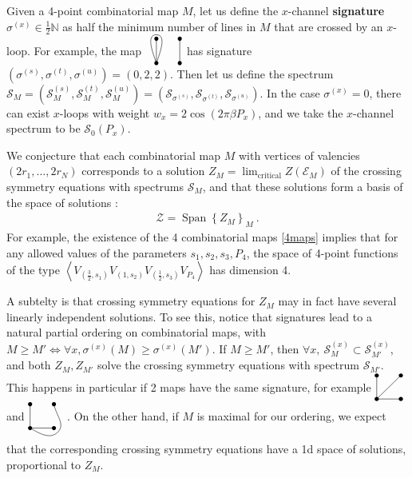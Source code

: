 \documentclass[12pt, a4paper]{article}
\newcommand{\myindex}[1]{\textbf{\boldmath #1}}
\newcommand{\vertices}{
\coordinate (base) at (0, 1);
\draw (0, 0) node[fill, circle, minimum size = 1.3mm, inner sep = 0]{};
  \draw (3, 0) node[fill, circle, minimum size = 1.3mm, inner sep = 0]{};
  \draw (0, 3) node[fill, circle, minimum size = 1.3mm, inner sep = 0]{};
  \draw (3, 3) node[fill, circle, minimum size = 1.3mm, inner sep = 0]{};
}
\begin{document}
Given a 4-point combinatorial map $M$, let us define the $x$-channel \myindex{signature} $\sigma^{(x)}\in\frac12\mathbb{N}$ as half the minimum number of lines in $M$ that are crossed by an $x$-loop. For example, the map 
$
\begin{tikzpicture}[baseline=(base), scale = .25]
 \vertices
  \draw (0, 0) -- (0, 3);
  \draw (3, 0) -- (3, 3);
  \draw (0, 0) to [out = 70, in = 0] (0, 3.5) to [out = 180, in = 110] (0, 0);
 \end{tikzpicture}
 $
has signature $(\sigma^{(s)},\sigma^{(t)},\sigma^{(u)})=(0,2,2)$. Then let us define the spectrum $\mathcal{S}_M = (\mathcal{S}^{(s)}_M, \mathcal{S}^{(t)}_M, \mathcal{S}^{(u)}_M)= (\mathcal{S}_{\sigma^{(s)}},\mathcal{S}_{\sigma^{(t)}},\mathcal{S}_{\sigma^{(u)}})$.
In the case $\sigma^{(x)}=0$, there can exist $x$-loops with weight $w_x=2\cos(2\pi\beta P_x)$, and we take the $x$-channel spectrum to be $\mathcal{S}_0(P_x)$. 

We conjecture that each combinatorial map $M$ with vertices of valencies $(2r_1,\dots, 2r_N)$ corresponds to a solution $Z_M = \lim_\text{critical} Z(\mathcal{E}_M)$ of the crossing symmetry equations with spectrums $\mathcal{S}_M$, and that these solutions form a basis of the space of solutions \cite{gjnrs23}:
\begin{align}
 \mathcal{Z} = \operatorname{Span}\left\{ Z_M\right\}_{M}\  .
\end{align}
For example, the existence of the 4 combinatorial maps
\eqref{4maps} implies that for any allowed values of the parameters $s_1,s_2,s_3,P_4$, the space of 4-point functions of the type $\left<V_{(\frac32,s_1)}V_{(1,s_2)}V_{(\frac12,s_3)}V_{P_4}\right>$ has dimension 4. 

A subtelty is that crossing symmetry equations for $Z_M$ may in fact have several linearly independent solutions. To see this, notice that signatures lead to a natural partial ordering on combinatorial maps, with $M\geq M' \iff \forall x, \sigma^{(x)}(M)\geq \sigma^{(x)}(M')$. If $M\geq M'$, then $\forall x, \ \mathcal{S}_M^{(x)} \subset \mathcal{S}_{M'}^{(x)}$, and both $Z_M,Z_{M'}$ solve the crossing symmetry equations with spectrum $\mathcal{S}_{M'}$. This happens in particular if 2 maps have the same signature, for example 
$
\begin{tikzpicture}[baseline=(base), scale = .25]
 \vertices
  \draw (0, 0) -- (0, 3);
  \draw (0, 0) -- (3, 3);
  \draw (0, 0) -- (3, 0);
 \end{tikzpicture}
$ and $
 \begin{tikzpicture}[baseline=(base), scale = .25]
 \vertices
  \draw (0, 0) -- (3, 0);
  \draw (0, 0) -- (0, 3);
  \draw (0, 0) to [out = -30, in = -135] (3.5, -.5) to [out = 45, in = -80] (3, 3);
  \end{tikzpicture}
$. On the other hand, if $M$ is maximal for our ordering, we expect that the corresponding crossing symmetry equations have a 1d space of solutions, proportional to $Z_M$. 
\end{document}
